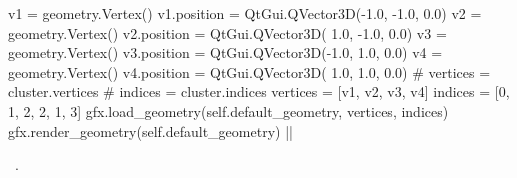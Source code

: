 \documentclass[%
    a4paper,    %
    justified,  %
    nobib,      %
    openany     %
]{tufte-book}
\begin{document}
\begin{fullwidth}
\begin{flushleft}
\begin{minipage}{\linewidth}
\begin{pythoncode}
        v1 = geometry.Vertex()
        v1.position = QtGui.QVector3D(-1.0, -1.0,  0.0)
        v2 = geometry.Vertex()
        v2.position = QtGui.QVector3D( 1.0, -1.0,  0.0)
        v3 = geometry.Vertex()
        v3.position = QtGui.QVector3D(-1.0,  1.0,  0.0)
        v4 = geometry.Vertex()
        v4.position = QtGui.QVector3D( 1.0,  1.0,  0.0)
        # vertices = cluster.vertices
        # indices  = cluster.indices
        vertices = [v1, v2, v3, v4]
        indices = [0, 1, 2, 2, 1, 3]
        gfx.load_geometry(self.default_geometry, vertices, indices)
        gfx.render_geometry(self.default_geometry)
|\NWsep|
\end{pythoncode}
\vspace{1.5ex}
\footnotesize
\begin{list}{}{\setlength{\itemsep}{-\parsep}\setlength{\itemindent}{-\leftmargin}}
\item \NWtxtMacroRefIn\ .

\item{}
\end{list}
\end{minipage}\vspace{4ex}
\end{flushleft}
\end{fullwidth}


\printbibliography{}
\end{document}
